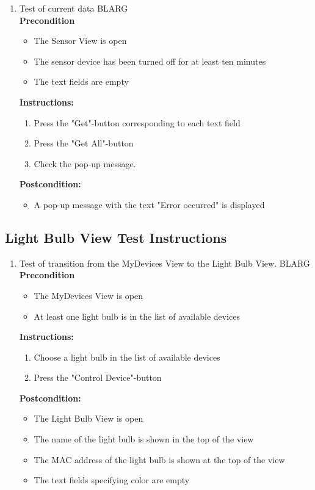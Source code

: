 \documentclass[a4paper]{article}
\newlength{\testlabellength}
\newenvironment{testlist}{\begin{enumerate}[label=\bfseries Instruction \thesubsection.\arabic* , labelindent=0pt, labelwidth=\testlabellength , leftmargin=2cm]}{\end{enumerate}}
\newenvironment{precondition}{
{\color{white}BLARG}\\ 
\textbf{Precondition}
\begin{itemize}[labelindent=0cm, labelwidth=2cm , leftmargin=1cm]
}
{\end{itemize}}
\newenvironment{instruction}{
\textbf{Instructions:}
\begin{enumerate}[label=\bfseries  \arabic*., labelindent=0cm, labelwidth=2cm , leftmargin=1cm]
}
{\end{enumerate}}
\newenvironment{postcondition}{
\textbf{Postcondition:}
\begin{itemize}[labelindent=0cm, labelwidth=2cm , leftmargin=1cm]
}
{\end{itemize}}
\begin{document}
\begin{appendices}
\begin{testlist}
	\item Test of current data
		\begin{precondition}
			\item The Sensor View is open
			\item The sensor device has been turned off for at least ten minutes
			\item The text fields are empty
		\end{precondition}
		\begin{instruction}
			\item Press the "Get"-button corresponding to each text field
			\item Press the "Get All"-button
			\item Check the pop-up message.
		\end{instruction}
		\begin{postcondition}
			\item A pop-up message with the text "Error occurred" is displayed
		\end{postcondition}
\end{testlist}

\subsection{Light Bulb View Test Instructions}
\begin{testlist}

    \item Test of transition from the MyDevices View to the Light Bulb View. \label{LightBulbTest1}
    	\begin{precondition}
    		\item The MyDevices View is open
    		\item At least one light bulb is in the list of available devices
    	\end{precondition}
    	\begin{instruction}
    			\item Choose a light bulb in the list of available devices
    			\item Press the "Control Device"-button
    	\end{instruction}
    	\begin{postcondition}
    		\item The Light Bulb View is open
    		\item The name of the light bulb is shown in the top of the view
    		\item The MAC address of the light bulb is shown at the top of the view
    		\item The text fields specifying color are empty
    	\end{postcondition}


\end{testlist}
\end{appendices}
\end{document}
